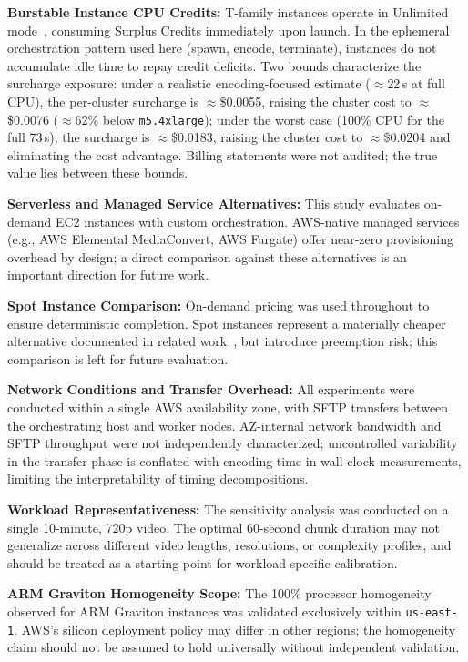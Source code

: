 \documentclass[conference]{IEEEtran}
\begin{document}
\textbf{Burstable Instance CPU Credits:} T-family instances operate in Unlimited mode~\cite{awscredits}, consuming Surplus Credits immediately upon launch. In the ephemeral orchestration pattern used here (spawn, encode, terminate), instances do not accumulate idle time to repay credit deficits. Two bounds characterize the surcharge exposure: under a realistic encoding-focused estimate ($\approx$22\,s at full CPU), the per-cluster surcharge is $\approx$\$0.0055, raising the cluster cost to $\approx$\$0.0076 ($\approx$62\% below \texttt{m5.4xlarge}); under the worst case (100\% CPU for the full 73\,s), the surcharge is $\approx$\$0.0183, raising the cluster cost to $\approx$\$0.0204 and eliminating the cost advantage. Billing statements were not audited; the true value lies between these bounds.

\textbf{Serverless and Managed Service Alternatives:} This study evaluates on-demand EC2 instances with custom orchestration. AWS-native managed services (e.g., AWS Elemental MediaConvert, AWS Fargate) offer near-zero provisioning overhead by design; a direct comparison against these alternatives is an important direction for future work.

\textbf{Spot Instance Comparison:} On-demand pricing was used throughout to ensure deterministic completion. Spot instances represent a materially cheaper alternative documented in related work~\cite{b21,b19}, but introduce preemption risk; this comparison is left for future evaluation.

\textbf{Network Conditions and Transfer Overhead:} All experiments were conducted within a single AWS availability zone, with SFTP transfers between the orchestrating host and worker nodes. AZ-internal network bandwidth and SFTP throughput were not independently characterized; uncontrolled variability in the transfer phase is conflated with encoding time in wall-clock measurements, limiting the interpretability of timing decompositions.

\textbf{Workload Representativeness:} The sensitivity analysis was conducted on a single 10-minute, 720p video. The optimal 60-second chunk duration may not generalize across different video lengths, resolutions, or complexity profiles, and should be treated as a starting point for workload-specific calibration.

\textbf{ARM Graviton Homogeneity Scope:} The 100\% processor homogeneity observed for ARM Graviton instances was validated exclusively within \texttt{us-east-1}. AWS's silicon deployment policy may differ in other regions; the homogeneity claim should not be assumed to hold universally without independent validation.
\end{document}
